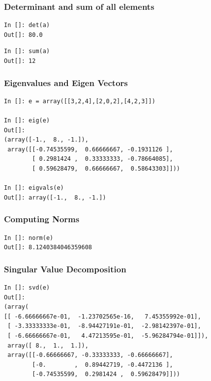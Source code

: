 \documentclass[14pt,compress]{beamer}
\newcounter{time}
\newcommand{\inctime}[1]{\addtocounter{time}{#1}{\tiny \thetime\ m}}
\begin{document}
\begin{frame}[fragile]
\frametitle{Determinant and sum of all elements}
\begin{lstlisting}
In []: det(a)
Out[]: 80.0
\end{lstlisting}
  \begin{lstlisting}
In []: sum(a)
Out[]: 12
  \end{lstlisting}

\end{frame}

\begin{frame}[fragile]
\frametitle{Eigenvalues and Eigen Vectors}
\begin{small}
\begin{lstlisting}
In []: e = array([[3,2,4],[2,0,2],[4,2,3]])

In []: eig(e)
Out[]:
(array([-1.,  8., -1.]),
 array([[-0.74535599,  0.66666667, -0.1931126 ],
        [ 0.2981424 ,  0.33333333, -0.78664085],
        [ 0.59628479,  0.66666667,  0.58643303]]))

In []: eigvals(e)
Out[]: array([-1.,  8., -1.])
\end{lstlisting}
\end{small}
\end{frame}

\begin{frame}[fragile]
\frametitle{Computing Norms}
\begin{lstlisting}
In []: norm(e)
Out[]: 8.1240384046359608
\end{lstlisting}
\end{frame}

\begin{frame}[fragile]
  \frametitle{Singular Value Decomposition}
  \begin{small}
  \begin{lstlisting}
In []: svd(e)
Out[]:
(array(
[[ -6.66666667e-01,  -1.23702565e-16,   7.45355992e-01],
 [ -3.33333333e-01,  -8.94427191e-01,  -2.98142397e-01],
 [ -6.66666667e-01,   4.47213595e-01,  -5.96284794e-01]]),
 array([ 8.,  1.,  1.]),
 array([[-0.66666667, -0.33333333, -0.66666667],
        [-0.        ,  0.89442719, -0.4472136 ],
        [-0.74535599,  0.2981424 ,  0.59628479]]))
  \end{lstlisting}
  \end{small}
  \inctime{10}
\end{frame}
\end{document}
